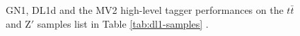 \begin{figure}[H]
    \centering
    \qquad
    \qquad
    \caption{ GN1, DL1d and the MV2 high-level tagger performances on the $t\bar{t}$ and $\textrm{Z}'$ samples list in Table \ref{tab:dl1-samples} \cite{dl1d-hllhc-ftag}.}
\label{fig:gn1-perf}
\end{figure}

